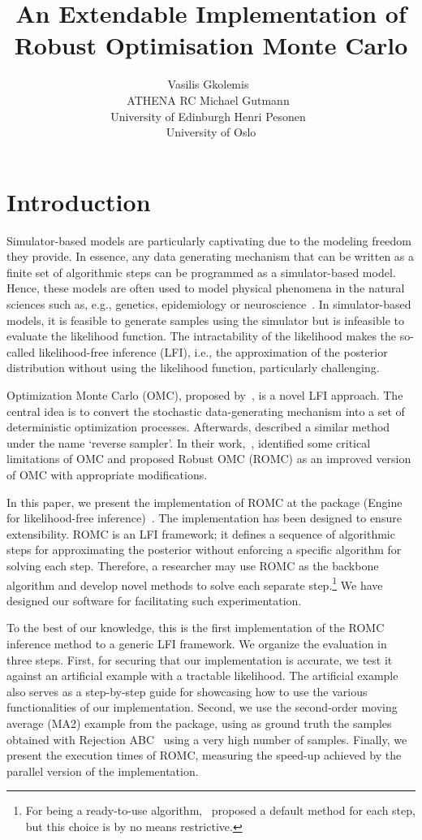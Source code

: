 \documentclass[article]{jss}
\author{Vasilis Gkolemis~\orcidlink{0000-0002-2636-0245}\\ATHENA RC \And
  Michael Gutmann~\orcidlink{0000-0002-5329-9910}\\University of Edinburgh \And
  Henri Pesonen~\orcidlink{0000-0003-4500-2926}\\University of Oslo}
\title{An Extendable \proglang{Python} Implementation of Robust Optimisation Monte Carlo}
\begin{document}
\section{Introduction}
\label{sec:intro}

Simulator-based models are particularly captivating due to the
modeling freedom they provide. In essence, any data generating
mechanism that can be written as a finite set of algorithmic steps can
be programmed as a simulator-based model. Hence, these models are
often used to model physical phenomena in the natural sciences such
as, e.g., genetics, epidemiology or neuroscience~\citet{gutmann2016,
  lintusaari2017, sisson2018, cranmer2020}. In simulator-based models,
it is feasible to generate samples using the simulator but is
infeasible to evaluate the likelihood function. The intractability of
the likelihood makes the so-called likelihood-free inference (LFI),
i.e., the approximation of the posterior distribution without using
the likelihood function, particularly challenging.

Optimization Monte Carlo (OMC), proposed by~\citet{Meeds2015}, is a
novel LFI approach. The central idea is to convert the stochastic
data-generating mechanism into a set of deterministic optimization
processes. Afterwards, \citet{Forneron2016} described a similar method
under the name `reverse sampler'. In their work,~\citet{Ikonomov2019},
identified some critical limitations of OMC and proposed Robust OMC
(ROMC) as an improved version of OMC with appropriate
modifications.

In this paper, we present the implementation of ROMC at the
 package  (Engine for likelihood-free
inference)~\citet{1708.00707}. The implementation has been designed to
ensure extensibility. ROMC is an LFI framework; it defines a sequence
of algorithmic steps for approximating the posterior without enforcing
a specific algorithm for solving each step. Therefore, a researcher
may use ROMC as the backbone algorithm and develop novel methods to
solve each separate step.\footnote{For being a ready-to-use
  algorithm,~\citet{Ikonomov2019} proposed a default method for each
  step, but this choice is by no means restrictive.} We have designed
our software for facilitating such experimentation.

To the best of our knowledge, this is the first implementation of the
ROMC inference method to a generic LFI framework. We organize the
evaluation in three steps. First, for securing that our implementation
is accurate, we test it against an artificial example with a tractable
likelihood. The artificial example also serves as a step-by-step guide
for showcasing how to use the various functionalities of our
implementation. Second, we use the second-order moving average (MA2)
example from the  package, using as ground truth the samples
obtained with Rejection ABC~\citet{lintusaari2017} using a very high
number of samples. Finally, we present the execution times of ROMC,
measuring the speed-up achieved by the parallel version of the
implementation.
\end{document}
